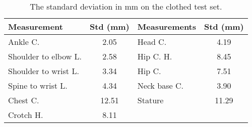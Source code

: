 \begin{table}[h]
\begin{center}
\scriptsize
\caption{The standard deviation in mm on the clothed test set.}
\label{tab:kinovis-res}
\begin{tabular}{|l|c|l|c|}
\hline
Measurement    & Std (mm) & Measurements & Std (mm) \\ \hline
Ankle C.             &        2.05                 & Head C.      &           4.19              \\
Shoulder to elbow L. &         2.58                & Hip C. H.    &             8.45            \\
Shoulder to wrist L. &          3.34               & Hip C.       &            7.51             \\
Spine to wrist L.    &           4.34              & Neck base C. &             3.90            \\
Chest C.             &           12.51              & Stature      &             11.29            \\ 
Crotch H.            &            8.11             &              &                         \\ \hline
\end{tabular}
\end{center}
\end{table}
